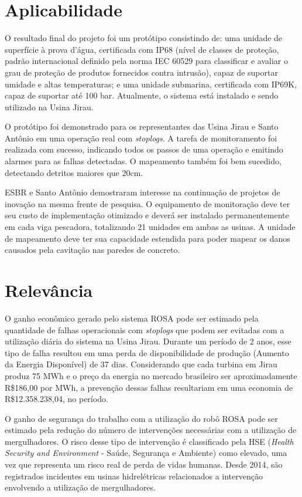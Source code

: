 \section{Aplicabilidade}

O resultado final do projeto foi um protótipo consistindo de: uma unidade de
superfície à prova d'água, certificada com IP68 (nível de classes de proteção,
padrão internacional definido pela norma IEC 60529 para classificar e avaliar
o grau de proteção de produtos fornecidos contra intrusão), capaz de suportar
umidade e altas temperaturas; e uma unidade submarina, certificada com IP69K,
capaz de suportar até 100 bar. Atualmente, o sistema está instalado e sendo
utilizado na Usina Jirau.

O protótipo foi demonstrado para os representantes das Usina Jirau e Santo
Antônio em uma operação real com \textit{stoplogs}. A tarefa de monitoramento
foi realizada com sucesso, indicando todos os passos de uma operação e emitindo
alarmes para as falhas detectadas. O mapeamento também foi bem sucedido,
detectando detritos maiores que 20cm. 

ESBR e Santo Antônio demostraram interesse
na continuação de projetos de inovação na mesma frente de pesquisa. O
equipamento de monitoração deve ter seu custo de implementação otimizado e
deverá ser instalado permanentemente em cada viga pescadora, totalizando 21
unidades em ambas as usinas. A unidade de mapeamento deve ter
sua capacidade estendida para poder mapear os danos causados pela cavitação nas
paredes de concreto.

\section{Relevância}

O ganho econômico gerado pelo sistema ROSA pode ser estimado pela quantidade de
falhas operacionais com \textit{stoplogs} que podem ser evitadas com a
utilização diária do sistema na Usina Jirau. Durante um período de 2 anos,
esse tipo de falha resultou em uma perda de disponibilidade de produção (Aumento
da Energia Disponível) de 37 dias. Considerando que cada turbina em Jirau produz
75 MWh e o preço da energia no mercado brasileiro ser aproximadamente R\$186,00
por MWh, a prevenção dessas falhas resultariam em uma economia de
R\$12.358.238,04, no período.

O ganho de segurança do trabalho com a utilização do robô ROSA pode ser estimado
pela redução do número de intervenções necessárias com a utilização de
mergulhadores. O risco desse tipo de intervenção é classificado pela HSE
(\textit{Health Security and Environment} - Saúde, Segurança e Ambiente) como
elevado, uma vez que representa um risco real de perda de vidas humanas. Desde
2014, são registrados incidentes em usinas hidrelétricas relacionados a
intervenção envolvendo a utilização de mergulhadores. 


